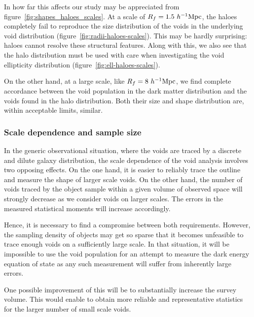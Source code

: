 In how far this affects our study may be appreciated from figure~\ref{fig:shapes_haloes_scales}. At a scale 
of $R_f=1.5~h^{-1} {\rm Mpc}$, the haloes completely fail to reproduce the size distribution of the voids in the underlying 
void distribution (figure~\ref{fig:radii-haloes-scales}). This may be hardly surprising: haloes cannot 
resolve these structural features. Along with this, we also see that the halo distribution must be used with care when 
investigating the void ellipticity distribution (figure~\ref{fig:ell-haloes-scales}). 

On the other hand, at a large scale, like $R_f=8 ~h^{-1} {\rm Mpc}$, we find complete accordance between the void population 
in the dark matter distribution and the voids found in the halo distribution. Both their size and shape 
distribution are, within acceptable limits, similar. 

\subsubsection{Scale dependence and sample size}
In the generic observational situation, where the voids are traced by a discrete and dilute galaxy distribution, 
the scale dependence of the void analysis involves two opposing effects. On the one hand, it is easier to reliably 
trace the outline and measure the shape of larger scale voids. On the other hand, the number of voids traced by the 
object sample within a given volume of observed space will strongly decrease as we consider voids on larger scales. The 
errors in the measured statistical moments will increase accordingly.

Hence, it is necessary to find a compromise between both requirements. However, the sampling density 
of objects may get so sparse that it becomes unfeasible to trace enough voids on a sufficiently large 
scale. In that situation, it will be impossible to use the void population for an attempt to measure 
the dark energy equation of state as any such measurement will suffer from inherently large errors.

One possible improvement of this will be to substantially increase the survey volume. This would 
enable to obtain more reliable and representative statistics for the larger number of 
small scale voids. 

